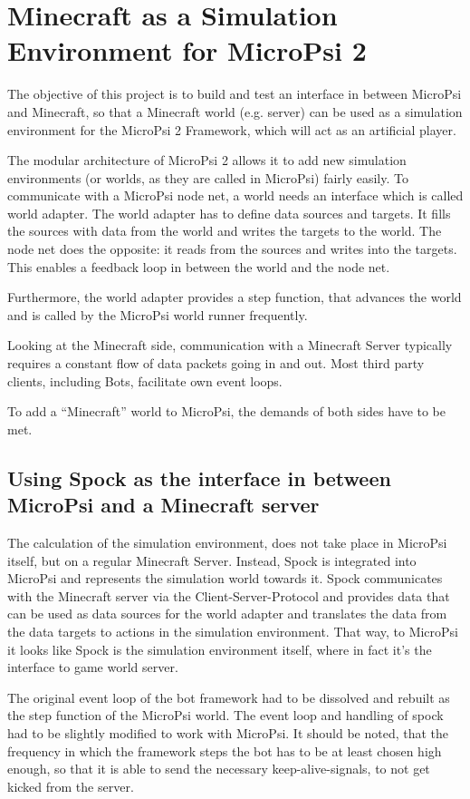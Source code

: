 \chapter{Minecraft as a Simulation Environment for MicroPsi 2}
The objective of this project is to build and test an interface in between MicroPsi and Minecraft, so that a Minecraft world (e.g. server) can be used as a simulation environment for the MicroPsi 2 Framework, which will act as an artificial player.

The modular architecture of MicroPsi 2 allows it to add new simulation environments (or worlds, as they are called in MicroPsi) fairly easily. To communicate with a MicroPsi node net, a world needs an interface which is called world adapter. The world adapter has to define data sources and targets. It fills the sources with data from the world and writes the targets to the world. The node net does the opposite: it reads from the sources and writes into the targets. This enables a feedback loop in between the world and the node net.

Furthermore, the world adapter provides a step function, that advances the world and is called by the MicroPsi world runner frequently.

Looking at the Minecraft side, communication with a Minecraft Server typically requires a constant flow of data packets going in and out. Most third party clients, including Bots, facilitate own event loops.

To add a ``Minecraft'' world to MicroPsi, the demands of both sides have to be met.

    \section{Using Spock as the interface in between MicroPsi and a Minecraft server}
The calculation of the simulation environment, does not take place in MicroPsi itself, but on a regular Minecraft Server. Instead, Spock is integrated into MicroPsi and represents the simulation world towards it. Spock communicates with the Minecraft server via the Client-Server-Protocol and provides data that can be used as data sources for the world adapter and translates the data from the data targets to actions in the simulation environment. That way, to MicroPsi it looks like Spock is the simulation environment itself, where in fact it's the interface to game world server.

The original event loop of the bot framework had to be dissolved and rebuilt as the step function of the MicroPsi world. The event loop and handling of spock had to be slightly modified to work with MicroPsi. It should be noted, that the frequency in which the framework steps the bot has to be at least chosen high enough, so that it is able to send the necessary keep-alive-signals, to not get kicked from the server.

